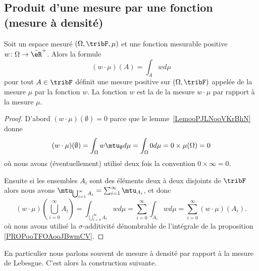 \subsection{Produit d'une mesure par une fonction (mesure à densité)}

\begin{propositionDef}\label{PropooVXPMooGSkyBo}
	Soit un espace mesuré \( (\Omega,\tribF,\mu)\) et une fonction mesurable positive \( w\colon \Omega\to \bar\eR^+\). Alors la formule
	\begin{equation}
		(w\cdot \mu)(A)=\int_Awd\mu
	\end{equation}
	pour tout \( A\in \tribF\) définit une mesure positive sur \( (\Omega,\tribF)\) appelée  de la mesure \( \mu\) par la fonction \( w\). La fonction \( w\) est la  de la mesure \( w\cdot \mu\) par rapport à la mesure \( \mu\).
\end{propositionDef}

\begin{proof}
	D'abord \( (w\cdot \mu)(\emptyset)=0\) parce que le lemme~\ref{LemooPJLNooVKrBhN} donne
	\begin{equation}
		(w\cdot \mu)(\emptyset)=\int_{\Omega}w\mtu_{\emptyset}d\mu=\int_{\Omega}0d\mu=0\times \mu(\Omega)=0
	\end{equation}
	où nous avons (éventuellement) utilisé deux fois la convention \( 0\times \infty=0\).


	Ensuite si les ensembles \( A_i\) sont des éléments deux à deux disjoints de \( \tribF\) alors nous avons \( \mtu_{\bigcup_{i=1}^{\infty}A_i}=\sum_{i=1}^{\infty}\mtu_{A_i}\), et donc
	\begin{equation}
		(w\cdot \mu)(\bigcup_{i=0}^{\infty}A_i) = \int_{\bigcup_{i=0}^{\infty}A_i}wd\mu=\sum_{i=0}^{\infty}\int_{A_i}wd\mu=\sum_{i=0}^{\infty}(w\cdot\mu)(A_i).  \end{equation}
	où nous avons utilisé la \( \sigma\)-additivité dénombrable de l'intégrale de la proposition \ref{PROPooTFOAooJBwmCV}.
\end{proof}

En particulier nous parlons souvent de mesure à densité par rapport à la mesure de Lebesgue. C'est alors la construction suivante.

